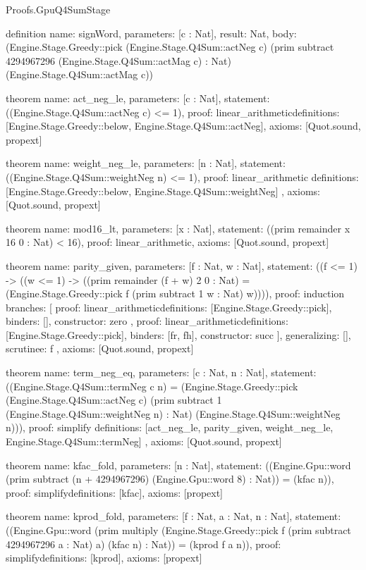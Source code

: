\begin{lexlean}{Proofs.GpuQ4SumStage}
\begin{semanticmodule}
definition{
  name: signWord,
  parameters: [c : Nat],
  result: Nat,
  body: (Engine.Stage.Greedy::pick (Engine.Stage.Q4Sum::actNeg c) (prim subtract 4294967296 (Engine.Stage.Q4Sum::actMag c) : Nat) (Engine.Stage.Q4Sum::actMag c))
}

theorem{
  name: act_neg_le,
  parameters: [c : Nat],
  statement: ((Engine.Stage.Q4Sum::actNeg c) <= 1),
  proof: linear_arithmetic{definitions: [Engine.Stage.Greedy::below, Engine.Stage.Q4Sum::actNeg]},
  axioms: [Quot.sound, propext]
}

theorem{
  name: weight_neg_le,
  parameters: [n : Nat],
  statement: ((Engine.Stage.Q4Sum::weightNeg n) <= 1),
  proof: linear_arithmetic{
    definitions: [Engine.Stage.Greedy::below, Engine.Stage.Q4Sum::weightNeg]
  },
  axioms: [Quot.sound, propext]
}

theorem{
  name: mod16_lt,
  parameters: [x : Nat],
  statement: ((prim remainder x 16 0 : Nat) < 16),
  proof: linear_arithmetic{},
  axioms: [Quot.sound, propext]
}

theorem{
  name: parity_given,
  parameters: [f : Nat, w : Nat],
  statement: ((f <= 1) -> ((w <= 1) -> ((prim remainder (f + w) 2 0 : Nat) = (Engine.Stage.Greedy::pick f (prim subtract 1 w : Nat) w)))),
  proof: induction{
    branches: [
      {
        proof: linear_arithmetic{definitions: [Engine.Stage.Greedy::pick]},
        binders: [],
        constructor: zero
      },
      {
        proof: linear_arithmetic{definitions: [Engine.Stage.Greedy::pick]},
        binders: [fr, fh],
        constructor: succ
      }
    ],
    generalizing: [],
    scrutinee: f
  },
  axioms: [Quot.sound, propext]
}

theorem{
  name: term_neg_eq,
  parameters: [c : Nat, n : Nat],
  statement: ((Engine.Stage.Q4Sum::termNeg c n) = (Engine.Stage.Greedy::pick (Engine.Stage.Q4Sum::actNeg c) (prim subtract 1 (Engine.Stage.Q4Sum::weightNeg n) : Nat) (Engine.Stage.Q4Sum::weightNeg n))),
  proof: simplify{
    definitions: [act_neg_le, parity_given, weight_neg_le, Engine.Stage.Q4Sum::termNeg]
  },
  axioms: [Quot.sound, propext]
}

theorem{
  name: kfac_fold,
  parameters: [n : Nat],
  statement: ((Engine.Gpu::word (prim subtract (n + 4294967296) (Engine.Gpu::word 8) : Nat)) = (kfac n)),
  proof: simplify{definitions: [kfac]},
  axioms: [propext]
}

theorem{
  name: kprod_fold,
  parameters: [f : Nat, a : Nat, n : Nat],
  statement: ((Engine.Gpu::word (prim multiply (Engine.Stage.Greedy::pick f (prim subtract 4294967296 a : Nat) a) (kfac n) : Nat)) = (kprod f a n)),
  proof: simplify{definitions: [kprod]},
  axioms: [propext]
}


\end{semanticmodule}
\end{lexlean}
